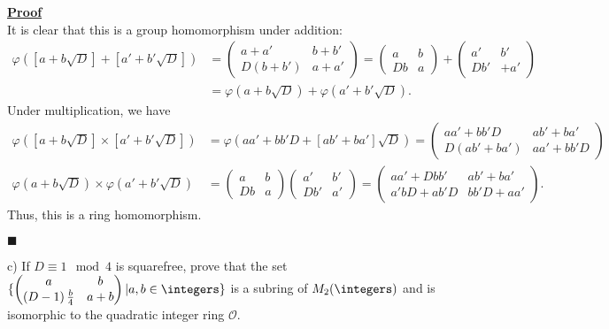 \documentclass[12pt,a4paper]{article}
\newenvironment{proof}
{
\textbf{\underline{Proof}} \\
}
{
\begin{flushright}
$\blacksquare$
\end{flushright}}
\begin{document}
\begin{proof}
	It is clear that this is a group homomorphism under addition:
	\begin{align*}
		\varphi([a + b\sqrt{D}] + [a' + b'\sqrt{D}]) &= 
		\begin{pmatrix}
			a + a' & b + b' \\
			D(b + b') & a + a'
		\end{pmatrix}
		=
		\begin{pmatrix}
		a & b \\
		Db & a
		\end{pmatrix}
		+
		\begin{pmatrix}
		a' & b' \\
		Db' & +a'
		\end{pmatrix}
		\\
		&=
		\varphi(a + b\sqrt{D}) + \varphi(a' + b'\sqrt{D})
	.\end{align*}
	Under multiplication, we have
	\begin{align*}
		\varphi([a + b\sqrt{D}] \times [a' + b'\sqrt{D}]) &= \varphi(aa' + bb'D + [ab' + ba']\sqrt{D}) =
		\begin{pmatrix}
			aa' + bb'D & ab' + ba' \\
			D(ab' + ba') & aa' + bb'D
		\end{pmatrix} \\
		\varphi(a + b\sqrt{D}) \times \varphi(a' + b'\sqrt{D}) &= 
		\begin{pmatrix}
			a & b \\
			Db & a
		\end{pmatrix}
		\begin{pmatrix}
			a' & b' \\
			Db' & a'
		\end{pmatrix}
		=
		\begin{pmatrix}
			aa' + Dbb' & ab' + ba' \\
			a'bD + ab'D & bb'D + aa'
		\end{pmatrix}
	.\end{align*}
	Thus, this is a ring homomorphism.
\end{proof}

c) If $D \equiv 1 \mod{4}$ is squarefree, prove that the set $\{ \begin{pmatrix}
        a & b \\
        \left( D-1 \right)\frac{b}{4} & a+b
\end{pmatrix} | a,b \in \integers \} $ is a subring of $M_2(\integers)$ and is isomorphic to the quadratic integer ring $\mathcal{O}$.
\end{document}
